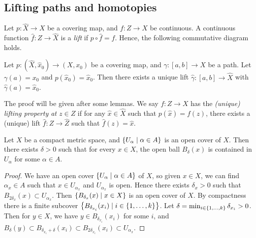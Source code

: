 \subsection{Lifting paths and homotopies}
\begin{definition}
	Let \( p \colon \hat X \to X \) be a covering map, and \( f \colon Z \to X \) be continuous.
	A continuous function \( \hat f \colon Z \to \hat X \) is a \emph{lift} if \( p \circ \hat f = f \).
	Hence, the following commutative diagram holds.
	\begin{center}
	\end{center}
\end{definition}
\begin{theorem}
	Let \( p \colon (\hat X, \hat x_0) \to (X, x_0) \) be a covering map, and \( \gamma \colon [a,b] \to X \) be a path.
	Let \( \gamma(a) = x_0 \) and \( p(\hat x_0) = \hat x_0 \).
	Then there exists a unique lift \( \hat\gamma \colon [a,b] \to \hat X \) with \( \hat \gamma(a) = \hat x_0 \).
\end{theorem}
The proof will be given after some lemmas.
We say \( f \colon Z \to X \) has the \emph{(unique) lifting property at \( z \in Z \)} if for any \( \hat x \in \hat X \) such that \( p(\hat x) = f(z) \), there exists a (unique) lift \( \hat f \colon Z \to \hat Z \) such that \( \hat f(z) = \hat x \).
\begin{lemma}
	Let \( X \) be a compact metric space, and \( \qty{U_\alpha \mid \alpha \in A} \) is an open cover of \( X \).
	Then there exists \( \delta > 0 \) such that for every \( x \in X \), the open ball \( B_\delta(x) \) is contained in \( U_\alpha \) for some \( \alpha \in A \).
\end{lemma}
\begin{proof}
	We have an open cover \( \qty{U_\alpha \mid \alpha \in A} \) of \( X \), so given \( x \in X \), we can find \( \alpha_x \in A \) such that \( x \in U_{\alpha_x} \) and \( U_{\alpha_x} \) is open.
	Hence there exists \( \delta_x > 0 \) such that \( B_{2\delta_x}(x) \subset U_{\alpha_x} \).
	Then \( \qty{B_{\delta_x}(x) \mid x \in X} \) is an open cover of \( X \).
	By compactness there is a finite subcover \( \qty{B_{\delta_{x_i}}(x_i) \mid i \in \qty{1, \dots, k}} \).
	Let \( \delta = \min_{i \in \qty{1, \dots, k}} \delta_{x_i} > 0 \).
	Then for \( y \in X \), we have \( y \in B_{\delta_{x_i}}(x_i) \) for some \( i \), and \( B_\delta(y) \subset B_{\delta_{x_i} + \delta}(x_i) \subset B_{2\delta_{x_i}}(x_i) \subset U_{\alpha_x} \).
\end{proof}
